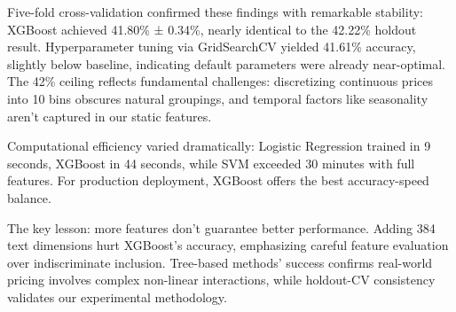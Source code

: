 \documentclass[12pt,a4paper]{article}
\begin{document}
Five-fold cross-validation confirmed these findings with remarkable stability: XGBoost achieved 41.80\% ± 0.34\%, nearly identical to the 42.22\% holdout result. Hyperparameter tuning via GridSearchCV yielded 41.61\% accuracy, slightly below baseline, indicating default parameters were already near-optimal. The 42\% ceiling reflects fundamental challenges: discretizing continuous prices into 10 bins obscures natural groupings, and temporal factors like seasonality aren't captured in our static features.

Computational efficiency varied dramatically: Logistic Regression trained in 9 seconds, XGBoost in 44 seconds, while SVM exceeded 30 minutes with full features. For production deployment, XGBoost offers the best accuracy-speed balance.

The key lesson: more features don't guarantee better performance. Adding 384 text dimensions hurt XGBoost's accuracy, emphasizing careful feature evaluation over indiscriminate inclusion. Tree-based methods' success confirms real-world pricing involves complex non-linear interactions, while holdout-CV consistency validates our experimental methodology.
\end{document}
